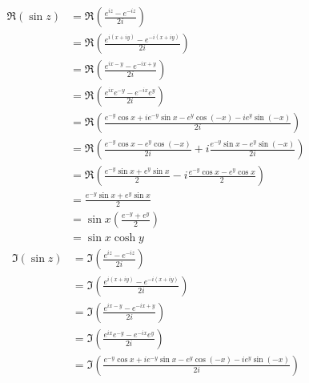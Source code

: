 \documentclass[fleqn, a4paper, 11pt, oneside]{amsart}
\theoremstyle{definition}
\theoremstyle{theorem}
\begin{document}
\begin{solution}
	\begin{align*}
		\Re(\sin z) & = \Re\left( \frac{e^{i z} - e^{-i z}}{2 i} \right)                                                        \\
                            & = \Re\left( \frac{e^{i (x + i y)} - e^{-i (x + i y)}}{2 i} \right)                                        \\
                            & = \Re\left( \frac{e^{i x - y} - e^{-i x + y}}{2 i} \right)                                                \\
                            & = \Re\left( \frac{e^{i x} e^{-y} - e^{-i x} e^{y}}{2 i} \right)                                           \\
                            & = \Re\left( \frac{e^{-y} \cos x + i e^{-y} \sin x - e^y \cos(-x) - i e^y \sin(-x)}{2 i} \right)           \\
                            & = \Re\left( \frac{e^{-y} \cos x - e^y \cos(-x)}{2 i} + i \frac{e^{-y} \sin x - e^y \sin(-x)}{2 i} \right) \\
                            & = \Re\left( \frac{e^{-y} \sin x + e^y \sin x}{2} - i \frac{e^{-y} \cos x - e^y \cos x}{2} \right)         \\
                            & = \frac{e^{-y} \sin x + e^y \sin x}{2}                                                                    \\
                            & = \sin x \left( \frac{e^{-y} + e^y}{2} \right)                                                            \\
                            & = \sin x \cosh y
	\end{align*}
	\begin{align*}
		\Im(\sin z) & = \Im\left( \frac{e^{i z} - e^{-i z}}{2 i} \right)                                                        \\
                            & = \Im\left( \frac{e^{i (x + i y)} - e^{-i (x + i y)}}{2 i} \right)                                        \\
                            & = \Im\left( \frac{e^{i x - y} - e^{-i x + y}}{2 i} \right)                                                \\
                            & = \Im\left( \frac{e^{i x} e^{-y} - e^{-i x} e^{y}}{2 i} \right)                                           \\
                            & = \Im\left( \frac{e^{-y} \cos x + i e^{-y} \sin x - e^y \cos(-x) - i e^y \sin(-x)}{2 i} \right)           \\

\end{align*}
\end{solution}
\end{document}
